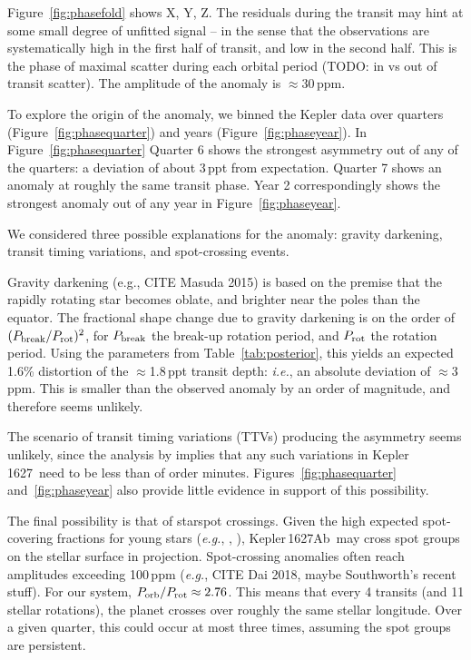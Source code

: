 \documentclass[12pt,modern,tighten]{aastex63}
\newcommand{\sn}{Kepler\,1627} %
\newcommand{\pn}{Kepler\,1627Ab} %
\begin{document}
Figure~\ref{fig:phasefold} shows X, Y, Z.  The residuals during the
transit may hint at some small degree of unfitted signal -- in the
sense that the observations are systematically high in the first half
of transit, and low in the second half.  This is the phase of maximal
scatter during each orbital period (TODO: in vs out of transit
scatter).  The amplitude of the anomaly is $\approx$30\,ppm.

To explore the origin of the anomaly, we binned the Kepler data over
quarters (Figure~\ref{fig:phasequarter}) and years
(Figure~\ref{fig:phaseyear}).  In Figure~\ref{fig:phasequarter}
Quarter 6 shows the strongest asymmetry out of any of the quarters: a
deviation of about 3\,ppt from expectation.  Quarter 7 shows an
anomaly at roughly the same transit phase.  Year 2 correspondingly
shows the strongest anomaly out of any year in
Figure~\ref{fig:phaseyear}.

We considered three possible explanations for the anomaly: gravity
darkening, transit timing variations, and spot-crossing events.

Gravity darkening (e.g., CITE Masuda 2015) is based on the premise
that the rapidly rotating star becomes oblate, and brighter near the
poles than the equator.  The fractional shape change due to gravity
darkening is on the order of $(P_{\rm break}/P_{\rm rot})^2$, for
$P_{\rm break}$ the break-up rotation period, and $P_{\rm rot}$ the
rotation period.  Using the parameters from Table~\ref{tab:posterior},
this yields an expected 1.6\% distortion of the $\approx$1.8\,ppt
transit depth: {\it i.e.}, an absolute deviation of $\approx$3\,ppm.
This is smaller than the observed anomaly by an order of magnitude,
and therefore seems unlikely.

The scenario of transit timing variations (TTVs) producing the
asymmetry seems unlikely, since the analysis by
\citet{holczer_transit_2016} implies that any such variations in \sn\
need to be less than of order minutes.  Figures~\ref{fig:phasequarter}
and~\ref{fig:phaseyear} also provide little evidence in support of
this possibility.

The final possibility is that of starspot crossings.  Given the high
expected spot-covering fractions for young stars ({\it e.g.},
\citealt{morris_relationship_2020}, \citealt{plavchan_planet_2020}),
\pn\ may cross spot groups on the stellar surface in projection.
Spot-crossing anomalies often reach amplitudes exceeding 100\,ppm
({\it e.g.}, CITE Dai 2018, maybe Southworth's recent stuff).  For our
system,  $P_{\rm orb}/P_{\rm rot} \approx 2.76$.  This means that
every 4 transits (and 11 stellar rotations), the planet crosses over
roughly the same stellar longitude.  Over a given quarter, this could
occur at most three times, assuming the spot groups are persistent.  
\end{document}
